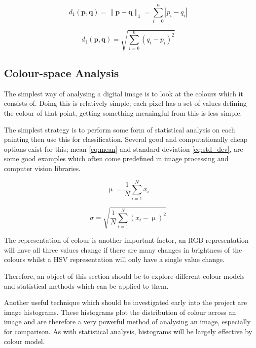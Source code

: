 \begin{equation}\label{eq:manhattan_distance}
d_1(\mathbf{p},\mathbf{q}) = \|\mathbf{p}-\mathbf{q}\|_1 = \sum^{n}_{i=0}{|p_i-q_i|}
\end{equation}

\begin{equation}\label{eq:euclidean_distance}
d_1(\mathbf{p}, \mathbf{q}) = \sqrt{\sum^{n}_{i=0}({q_i-p_i})^2}
\end{equation}

\subsection{Colour-space Analysis}
The simplest way of analysing a digital image is to look at the colours which it consists of.
Doing this is relatively simple; each pixel has a set of values defining the colour of that point,
getting something meaningful from this is less simple.

The simplest strategy is to perform some form of statistical analysis on each painting then use
this for classification. Several good and computationally cheap options exist for this; 
mean \eqref{eq:mean} and standard deviation \eqref{eq:std_dev}, are some good
examples which often come predefined in image processing and computer vision libraries.

\begin{equation}\label{eq:mean}
\upmu = \frac{1}{N}\sum_{i=1}^{N}x_i
\end{equation}

\begin{equation}\label{eq:std_dev}
\sigma = \sqrt{\frac{1}{N}\sum_{i=1}^{N}(x_i - \upmu)^2}
\end{equation}

The representation of colour is another important factor, an RGB representation will have all 
three values change if there are many changes in brightness of the colours whilst a HSV 
representation will only have a single value change.

Therefore, an object of this section should be to explore different colour models and statistical
methods which can be applied to them.

Another useful technique which should be investigated early into the project are image histograms.
These histograms plot the distribution of colour across an image and are therefore a very powerful
method of analysing an image, especially for comparison. As with statistical analysis, histograms
will be largely effective by colour model.

